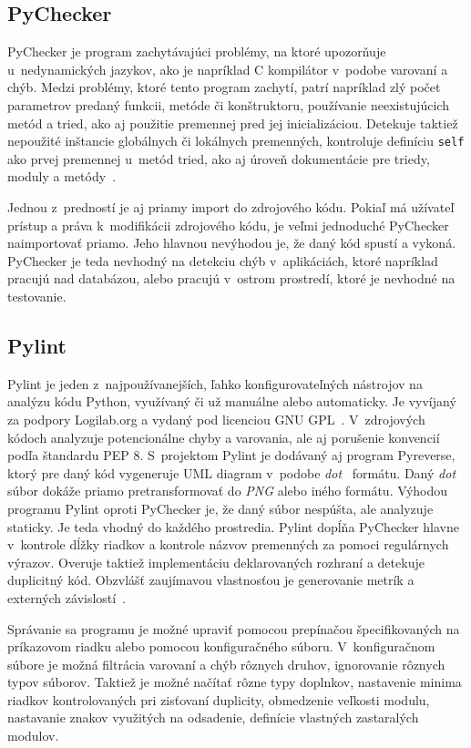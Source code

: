\documentclass[11pt,oneside,final]{fithesis2}
\begin{document}
\subsection{PyChecker}

	PyChecker je program zachytávajúci problémy, na ktoré upozorňuje u~nedynamických jazykov, ako je napríklad C kompilátor v~podobe varovaní a chýb. Medzi problémy, ktoré tento program zachytí, patrí napríklad zlý počet parametrov predaný funkcii, metóde či konštruktoru, používanie neexistujúcich metód a tried, ako aj použitie premennej pred jej inicializáciou. Detekuje taktiež nepoužité inštancie globálnych či lokálnych premenných, kontroluje definíciu \texttt{self} ako prvej premennej u~metód tried, ako aj úroveň dokumentácie pre triedy, moduly a metódy~\cite{pychecker}. 
	
	Jednou z~predností je aj priamy import do zdrojového kódu. Pokiaľ má užívateľ prístup a práva k~modifikácii zdrojového kódu, je veľmi jednoduché PyChecker naimportovať priamo. Jeho hlavnou nevýhodou je, že daný kód spustí a vykoná. PyChecker je teda nevhodný na detekciu chýb v~aplikáciách, ktoré napríklad pracujú nad databázou, alebo pracujú v~ostrom prostredí, ktoré je nevhodné na testovanie.

\subsection{Pylint}
	Pylint je jeden z~najpoužívanejších, ľahko konfigurovateľných nástrojov na analýzu kódu Python, využívaný či už manuálne alebo automaticky. Je vyvíjaný za podpory Logilab.org a vydaný pod licenciou GNU GPL~\cite{gnugpl}. V~zdrojových kódoch analyzuje potencionálne chyby a varovania, ale aj porušenie konvencií podľa štandardu PEP 8. S~projektom Pylint je dodávaný aj program Pyreverse, ktorý pre daný kód vygeneruje UML diagram v~podobe \textit{dot}~\cite{dotformat} formátu. Daný \textit{dot} súbor dokáže priamo pretransformovať do \textit{PNG} alebo iného formátu. Výhodou programu Pylint oproti PyChecker je, že daný súbor nespúšta, ale analyzuje staticky. Je teda vhodný do každého prostredia. Pylint dopĺňa PyChecker hlavne v~kontrole dĺžky riadkov a kontrole názvov premenných za pomoci regulárnych výrazov. Overuje taktiež implementáciu deklarovaných rozhraní a detekuje duplicitný kód.
    Obzvlášť zaujímavou vlastnosťou je generovanie metrík a externých závislostí~\cite{pylint}.

	Správanie sa programu je možné upraviť pomocou prepínačou špecifikovaných na príkazovom riadku alebo pomocou konfiguračného súboru. V~konfiguračnom súbore je možná filtrácia varovaní a chýb rôznych druhov, ignorovanie rôznych typov súborov. Taktiež je možné načítať rôzne typy doplnkov, nastavenie minima riadkov kontrolovaných pri zisťovaní duplicity, obmedzenie veľkosti modulu, nastavanie znakov využitých na odsadenie, definície vlastných zastaralých modulov.
    
\end{document}
